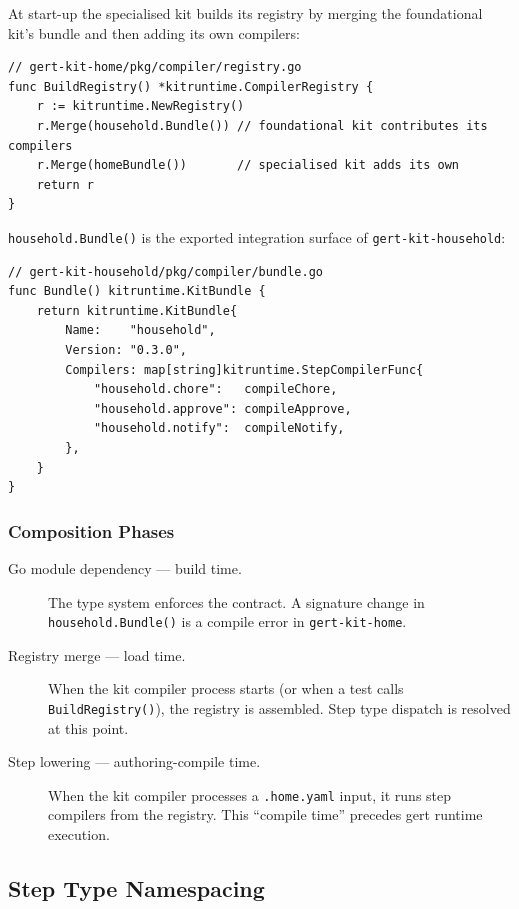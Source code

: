 At start-up the specialised kit builds its registry by merging the foundational
kit's bundle and then adding its own compilers:

\begin{verbatim}
// gert-kit-home/pkg/compiler/registry.go
func BuildRegistry() *kitruntime.CompilerRegistry {
    r := kitruntime.NewRegistry()
    r.Merge(household.Bundle()) // foundational kit contributes its compilers
    r.Merge(homeBundle())       // specialised kit adds its own
    return r
}
\end{verbatim}

\texttt{household.Bundle()} is the exported integration surface of
\texttt{gert-kit-household}:

\begin{verbatim}
// gert-kit-household/pkg/compiler/bundle.go
func Bundle() kitruntime.KitBundle {
    return kitruntime.KitBundle{
        Name:    "household",
        Version: "0.3.0",
        Compilers: map[string]kitruntime.StepCompilerFunc{
            "household.chore":   compileChore,
            "household.approve": compileApprove,
            "household.notify":  compileNotify,
        },
    }
}
\end{verbatim}

\subsubsection{Composition Phases}

\begin{description}
  \item[Go module dependency — build time.]  The type system enforces the
    contract.  A signature change in \texttt{household.Bundle()} is a compile
    error in \texttt{gert-kit-home}.

  \item[Registry merge --- load time.]  When the kit compiler process starts
    (or when a test calls \texttt{BuildRegistry()}), the registry is assembled.
    Step type dispatch is resolved at this point.

  \item[Step lowering --- authoring-compile time.]  When the kit compiler
    processes a \texttt{.home.yaml} input, it runs step compilers from the
    registry.  This ``compile time'' precedes gert runtime execution.
\end{description}

\subsection{Step Type Namespacing}
\label{subsec:kit-step-namespacing}

